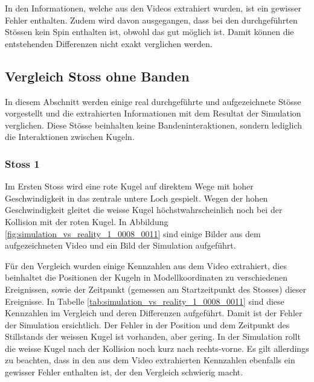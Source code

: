 In den Informationen, welche aus den Videos extrahiert wurden, ist ein gewisser Fehler enthalten.
Zudem wird davon ausgegangen, dass bei den durchgeführten Stössen kein Spin enthalten ist, obwohl das gut möglich ist.
Damit können die entstehenden Differenzen nicht exakt verglichen werden.

\subsection{Vergleich Stoss ohne Banden}
In diesem Abschnitt werden einige real durchgeführte und aufgezeichnete Stösse vorgestellt und die extrahierten Informationen mit
dem Resultat der Simulation verglichen.
Diese Stösse beinhalten keine Bandeninteraktionen, sondern lediglich die Interaktionen zwischen Kugeln.

\subsubsection{Stoss 1}
Im Ersten Stoss wird eine rote Kugel auf direktem Wege mit hoher Geschwindigkeit in das zentrale untere Loch gespielt.
Wegen der hohen Geschwindigkeit gleitet die weisse Kugel höchstwahrscheinlich noch bei der Kollision mit der roten Kugel.
In Abbildung \ref{fig:simulation_vs_reality_1_0008_0011} sind einige Bilder aus dem aufgezeichneten Video und ein Bild
der Simulation aufgeführt.

Für den Vergleich wurden einige Kennzahlen aus dem Video extrahiert, dies beinhaltet die Positionen der Kugeln
in Modellkoordinaten zu verschiedenen Ereignissen, sowie der Zeitpunkt (gemessen am Startzeitpunkt des Stosses) dieser Ereignisse.
In Tabelle \ref{tab:simulation_vs_reality_1_0008_0011} sind diese Kennzahlen im Vergleich und deren Differenzen aufgeführt.
Damit ist der Fehler der Simulation ersichtlich.
Der Fehler in der Position und dem Zeitpunkt des Stillstands der weissen Kugel ist vorhanden, aber gering.
In der Simulation rollt die weisse Kugel nach der Kollision noch kurz nach rechts-vorne.
Es gilt allerdings zu beachten, dass in den aus dem Video extrahierten Kennzahlen ebenfalls ein
gewisser Fehler enthalten ist, der den Vergleich schwierig macht.

